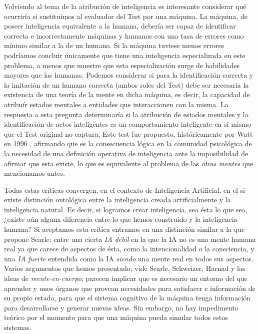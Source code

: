 \documentclass[12pt]{memoir}
\begin{document}
\nocite{newmind}

Volviendo al tema de la atribución de inteligencia es interesante considerar qué ocurriría si sustituímos al evaluador del Test por una máquina. La máquina, de poseer inteligencia equivalente a la humana, debería ser capaz de identificar correcta e incorrectamente máquinas y humanos con una tasa de errores como mínimo similar a la de un humano. Si la máquina tuviese menos errores podríamos concluir únicamente que tiene una inteligencia especializada en este problema, a menos que muestre que esta especialización surge de habilidades mayores que las humanas. Podemos considerar si para la identificación correcta y la imitación de un humano correcta (ambos roles del Test) debe ser necesaria la existencia de una teoría de la mente en dicha máquina, es decir, la capacidad de atribuír estados mentales a entidades que interaccionen con la misma. La respuesta a esta pregunta determinaría si la atribución de estados mentales y la identificación de actos inteligentes es un comportamiento inteligente en sí mismo que el Test original no captura. Este test fue propuesto, históricamente por Watt en 1996 \parencite[apartado 4.4.3]{afterTuring}, afirmando que es la consecuencia lógica en la comunidad psicológica de la necesidad de una definición operativa de inteligencia ante la imposibilidad de afirmar que esta existe, lo que es equivalente al problema de las \textit{otras mentes} que mencionamos antes.

Todas estas críticas convergen, en el contexto de Inteligencia Artificial, en el si existe distinción ontológica entre la inteligencia creada artificialmente y la inteligencia natural. Es decir, si logramos crear inteligencia, sea ésta lo que sea, ¿existe aún alguna diferencia entre lo que hemos construido y la inteligencia humana? Si aceptamos esta crítica entramos en una distinción similar a la que propone Searle: entre una cierta \textit{IA débil} en la que la IA no es una mente humana real ya que carece de aspectos de ésta, como la intencionalidad o la consciencia, y una \textit{IA fuerte} entendida como la IA \textit{siendo} una mente real en todos sus aspectos. Varios argumentos que hemos presentado; vide Searle, Schweizer, Harnad y las ideas de \textit{mente-en-cuerpo}; parecen implicar que es necesario un entorno del que aprender y unos órganos que provean necesidades para satisfacer e información de su propio estado, para que el sistema cognitivo de la máquina tenga información para desarrollarse y generar nuevas ideas. Sin embargo, no hay impedimento teórico por el momento para que una máquina pueda simular todos estos sistemas. 
\end{document}
